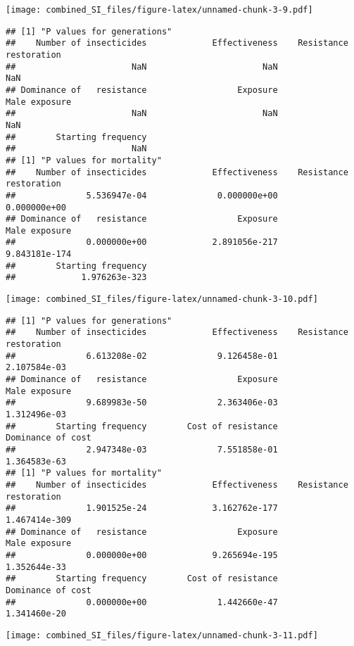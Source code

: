 \documentclass[
]{article}
\begin{document}
\texttt{[image: combined\_SI\_files/figure-latex/unnamed-chunk-3-9.pdf]}

\begin{verbatim}
## [1] "P values for generations"
##    Number of insecticides             Effectiveness    Resistance restoration 
##                       NaN                       NaN                       NaN 
## Dominance of   resistance                  Exposure             Male exposure 
##                       NaN                       NaN                       NaN 
##        Starting frequency 
##                       NaN 
## [1] "P values for mortality"
##    Number of insecticides             Effectiveness    Resistance restoration 
##              5.536947e-04              0.000000e+00              0.000000e+00 
## Dominance of   resistance                  Exposure             Male exposure 
##              0.000000e+00             2.891056e-217             9.843181e-174 
##        Starting frequency 
##             1.976263e-323
\end{verbatim}

\texttt{[image: combined\_SI\_files/figure-latex/unnamed-chunk-3-10.pdf]}

\begin{verbatim}
## [1] "P values for generations"
##    Number of insecticides             Effectiveness    Resistance restoration 
##              6.613208e-02              9.126458e-01              2.107584e-03 
## Dominance of   resistance                  Exposure             Male exposure 
##              9.689983e-50              2.363406e-03              1.312496e-03 
##        Starting frequency        Cost of resistance         Dominance of cost 
##              2.947348e-03              7.551858e-01              1.364583e-63 
## [1] "P values for mortality"
##    Number of insecticides             Effectiveness    Resistance restoration 
##              1.901525e-24             3.162762e-177             1.467414e-309 
## Dominance of   resistance                  Exposure             Male exposure 
##              0.000000e+00             9.265694e-195              1.352644e-33 
##        Starting frequency        Cost of resistance         Dominance of cost 
##              0.000000e+00              1.442660e-47              1.341460e-20
\end{verbatim}

\texttt{[image: combined\_SI\_files/figure-latex/unnamed-chunk-3-11.pdf]}
\end{document}
